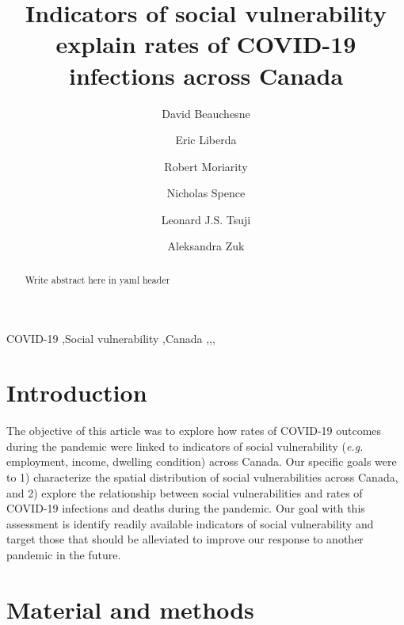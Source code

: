 \documentclass[preprint, 3p,
authoryear]{elsarticle} %
\begin{document}
\begin{frontmatter}

  \title{Indicators of social vulnerability explain rates of COVID-19
infections across Canada}
    \author[uoft]{David Beauchesne%
  }
    \author[tmu]{Eric Liberda%
  }
    \author[tmu]{Robert Moriarity%
  }
    \author[uoft]{Nicholas Spence%
  }
    \author[uoft]{Leonard J.S. Tsuji%
  }
    \author[qu]{Aleksandra Zuk%
  }
    \affiliation[tmu]{
    }
    \affiliation[qu]{
    }
  
  \begin{abstract}
  Write abstract here in yaml header
  \end{abstract}
    \begin{keyword}
    COVID-19 \sep Social vulnerability \sep Canada \sep  \sep  \sep 
    
  \end{keyword}
  
 \end{frontmatter}

\onehalfspacing

\hypertarget{introduction}{%
\section{Introduction}\label{introduction}}

The objective of this article was to explore how rates of COVID-19
outcomes during the pandemic were linked to indicators of social
vulnerability (\emph{e.g.} employment, income, dwelling condition)
across Canada. Our specific goals were to 1) characterize the spatial
distribution of social vulnerabilities across Canada, and 2) explore the
relationship between social vulnerabilities and rates of COVID-19
infections and deaths during the pandemic. Our goal with this assessment
is identify readily available indicators of social vulnerability and
target those that should be alleviated to improve our response to
another pandemic in the future.

\hypertarget{material-and-methods}{%
\section{Material and methods}\label{material-and-methods}}
\end{document}
